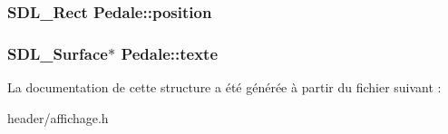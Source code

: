 \subsubsection[{\texorpdfstring{position}{position}}]{\setlength{\rightskip}{0pt plus 5cm}S\+D\+L\+\_\+\+Rect Pedale\+::position}\hypertarget{structPedale_aedc7c00a855b7bfbe5eb30343cfd0db3}{}\label{structPedale_aedc7c00a855b7bfbe5eb30343cfd0db3}
\subsubsection[{\texorpdfstring{texte}{texte}}]{\setlength{\rightskip}{0pt plus 5cm}S\+D\+L\+\_\+\+Surface$\ast$ Pedale\+::texte}\hypertarget{structPedale_a9cd599cf3cfc349479da33be6b72d465}{}\label{structPedale_a9cd599cf3cfc349479da33be6b72d465}


La documentation de cette structure a été générée à partir du fichier suivant \+:\begin{DoxyCompactItemize}
\item 
header/affichage.\+h\end{DoxyCompactItemize}
